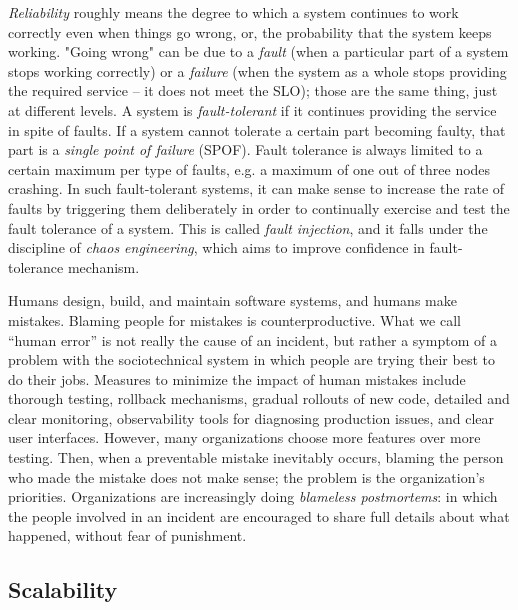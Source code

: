 \documentclass[table, xcdraw]{article}%
\begin{document}
\textit{Reliability} roughly means the degree to which a system continues to work correctly even when things go wrong, or, the probability that the system keeps working. "Going wrong" can be due to a \textit{fault} (when a particular part of a system stops working correctly) or a \textit{failure} (when the system as a whole stops providing the required service -- it does not meet the SLO); those are the same thing, just at different levels. A system is \textit{fault-tolerant} if it continues providing the service in spite of faults. If a system cannot tolerate a certain part becoming faulty, that part is a \textit{single point of failure} (SPOF). Fault tolerance is always limited to a certain maximum per type of faults, e.g. a maximum of one out of three nodes crashing. In such fault-tolerant systems, it can make sense to increase the rate of faults by triggering them deliberately in order to continually exercise and test the fault tolerance of a system. This is called \textit{fault injection}, and it falls under the discipline of \textit{chaos engineering}, which aims to improve confidence in fault-tolerance mechanism.

Humans design, build, and maintain software systems, and humans make mistakes. Blaming people for mistakes is counterproductive. What we call “human error” is not really the cause of an incident, but rather a symptom of a problem with the sociotechnical system in which people are trying their best to do their jobs. Measures to minimize the impact of human mistakes include thorough testing, rollback mechanisms, gradual rollouts of new code, detailed and clear monitoring, observability tools for diagnosing production issues, and clear user interfaces. However, many organizations choose more features over more testing. Then, when a preventable mistake inevitably occurs, blaming the person who made the mistake does not make sense; the problem is the organization’s priorities. Organizations are increasingly doing \textit{blameless postmortems}: in which the people involved in an incident are encouraged to share full details about what happened, without fear of punishment.

\subsection{Scalability}
\end{document}
